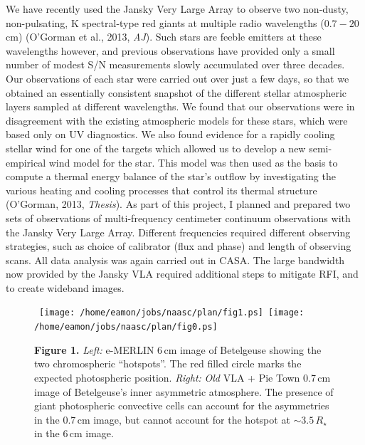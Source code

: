 \documentclass[11pt]{letter} %
\begin{document}
We have recently used the Jansky Very Large Array to observe two non-dusty, non-pulsating, K spectral-type red giants at multiple radio wavelengths ($0.7 - 20$\,cm) (O'Gorman et al., 2013, \textit{AJ}). Such stars are feeble emitters at these wavelengths however, and previous observations have provided only a small number of modest S/N measurements slowly accumulated over three decades. Our observations of each star were carried out over just a few days, so that we obtained an essentially consistent snapshot of the different stellar atmospheric layers sampled at different wavelengths. We found that our observations were in disagreement with the existing atmospheric models for these stars, which were based only on UV diagnostics. We also found evidence for a rapidly cooling stellar wind for one of the targets which allowed us to develop a new semi-empirical wind model for the star. This model was then used as the basis to compute a thermal energy balance of the star's outflow by investigating the various heating and cooling processes that control its thermal structure (O'Gorman, 2013, \textit{Thesis}). As part of this project, I planned and prepared two sets of observations of multi-frequency centimeter continuum observations with the Jansky Very Large Array. Different frequencies required different observing strategies, such as choice of calibrator (flux and phase) and length of observing scans. All data analysis was again carried out in CASA. The large bandwidth now provided by the Jansky VLA required additional steps to mitigate RFI, and to create wideband images.

\begin{figure}[!ht]
\centering 
\mbox{
          \texttt{[image: /home/eamon/jobs/naasc/plan/fig1.ps]}
          \texttt{[image: /home/eamon/jobs/naasc/plan/fig0.ps]}
          }
\caption{ {\small  \textbf{Figure 1.} \textit{Left:} e-MERLIN 6\,cm image of Betelgeuse showing the two chromospheric ``hotspots''. The red filled circle marks the expected photospheric position. \textit{Right:} \textit{Old} VLA + Pie Town 0.7\,cm image of Betelgeuse's inner asymmetric atmosphere. The presence of giant photospheric convective cells can account for the asymmetries in the 0.7\,cm image, but cannot account for the hotspot at $\sim 3.5\,R_{\star}$ in the 6\,cm image.}}
\end{figure}
\end{document}
